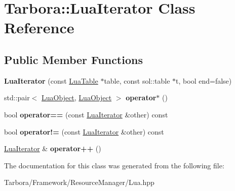 \hypertarget{classTarbora_1_1LuaIterator}{}\section{Tarbora\+:\+:Lua\+Iterator Class Reference}
\label{classTarbora_1_1LuaIterator}
\subsection*{Public Member Functions}
\begin{DoxyCompactItemize}
\item 
\mbox{\label{classTarbora_1_1LuaIterator_a9557b508d714575cfa42cbec839f507b}} 
{\bfseries Lua\+Iterator} (const \hyperlink{classTarbora_1_1LuaTable}{Lua\+Table} $\ast$table, const sol\+::table $\ast$t, bool end=false)
\item 
\mbox{\label{classTarbora_1_1LuaIterator_afcf16cc172823b77ac5e77d6d2a213e7}} 
std\+::pair$<$ \hyperlink{classTarbora_1_1LuaObject}{Lua\+Object}, \hyperlink{classTarbora_1_1LuaObject}{Lua\+Object} $>$ {\bfseries operator$\ast$} ()
\item 
\mbox{\label{classTarbora_1_1LuaIterator_a8a90eeebdc757b70927df71931559efa}} 
bool {\bfseries operator==} (const \hyperlink{classTarbora_1_1LuaIterator}{Lua\+Iterator} \&other) const
\item 
\mbox{\label{classTarbora_1_1LuaIterator_a05885289797a7a4d49448cd89990f370}} 
bool {\bfseries operator!=} (const \hyperlink{classTarbora_1_1LuaIterator}{Lua\+Iterator} \&other) const
\item 
\mbox{\label{classTarbora_1_1LuaIterator_a78e0a6b45dcb465720e19eef13c0e667}} 
\hyperlink{classTarbora_1_1LuaIterator}{Lua\+Iterator} \& {\bfseries operator++} ()
\end{DoxyCompactItemize}


The documentation for this class was generated from the following file\+:\begin{DoxyCompactItemize}
\item 
Tarbora/\+Framework/\+Resource\+Manager/Lua.\+hpp\end{DoxyCompactItemize}
